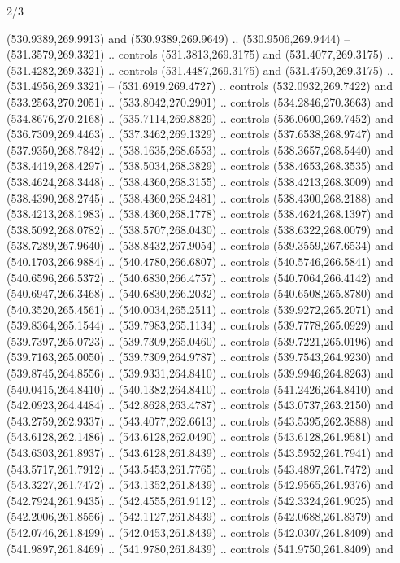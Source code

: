 \begin{flagdescription}{2/3}
\begin{scope}[xshift=0.5\flaglength,yshift=0.5\flagwidth,scale=\flagwidth/495.65]
\begin{scope}[y=0.8pt, x=0.8pt, yscale=-1,shift={(-463.76,-309.78)}]
  (530.9389,269.9913) and (530.9389,269.9649) .. (530.9506,269.9444) --
  (531.3579,269.3321) .. controls (531.3813,269.3175) and (531.4077,269.3175) ..
  (531.4282,269.3321) .. controls (531.4487,269.3175) and (531.4750,269.3175) ..
  (531.4956,269.3321) -- (531.6919,269.4727) .. controls (532.0932,269.7422) and
  (533.2563,270.2051) .. (533.8042,270.2901) .. controls (534.2846,270.3663) and
  (534.8676,270.2168) .. (535.7114,269.8829) .. controls (536.0600,269.7452) and
  (536.7309,269.4463) .. (537.3462,269.1329) .. controls (537.6538,268.9747) and
  (537.9350,268.7842) .. (538.1635,268.6553) .. controls (538.3657,268.5440) and
  (538.4419,268.4297) .. (538.5034,268.3829) .. controls (538.4653,268.3535) and
  (538.4624,268.3448) .. (538.4360,268.3155) .. controls (538.4213,268.3009) and
  (538.4390,268.2745) .. (538.4360,268.2481) .. controls (538.4300,268.2188) and
  (538.4213,268.1983) .. (538.4360,268.1778) .. controls (538.4624,268.1397) and
  (538.5092,268.0782) .. (538.5707,268.0430) .. controls (538.6322,268.0079) and
  (538.7289,267.9640) .. (538.8432,267.9054) .. controls (539.3559,267.6534) and
  (540.1703,266.9884) .. (540.4780,266.6807) .. controls (540.5746,266.5841) and
  (540.6596,266.5372) .. (540.6830,266.4757) .. controls (540.7064,266.4142) and
  (540.6947,266.3468) .. (540.6830,266.2032) .. controls (540.6508,265.8780) and
  (540.3520,265.4561) .. (540.0034,265.2511) .. controls (539.9272,265.2071) and
  (539.8364,265.1544) .. (539.7983,265.1134) .. controls (539.7778,265.0929) and
  (539.7397,265.0723) .. (539.7309,265.0460) .. controls (539.7221,265.0196) and
  (539.7163,265.0050) .. (539.7309,264.9787) .. controls (539.7543,264.9230) and
  (539.8745,264.8556) .. (539.9331,264.8410) .. controls (539.9946,264.8263) and
  (540.0415,264.8410) .. (540.1382,264.8410) .. controls (541.2426,264.8410) and
  (542.0923,264.4484) .. (542.8628,263.4787) .. controls (543.0737,263.2150) and
  (543.2759,262.9337) .. (543.4077,262.6613) .. controls (543.5395,262.3888) and
  (543.6128,262.1486) .. (543.6128,262.0490) .. controls (543.6128,261.9581) and
  (543.6303,261.8937) .. (543.6128,261.8439) .. controls (543.5952,261.7941) and
  (543.5717,261.7912) .. (543.5453,261.7765) .. controls (543.4897,261.7472) and
  (543.3227,261.7472) .. (543.1352,261.8439) .. controls (542.9565,261.9376) and
  (542.7924,261.9435) .. (542.4555,261.9112) .. controls (542.3324,261.9025) and
  (542.2006,261.8556) .. (542.1127,261.8439) .. controls (542.0688,261.8379) and
  (542.0746,261.8499) .. (542.0453,261.8439) .. controls (542.0307,261.8409) and
  (541.9897,261.8469) .. (541.9780,261.8439) .. controls (541.9750,261.8409) and

\end{scope}
\end{scope}
\end{flagdescription}
